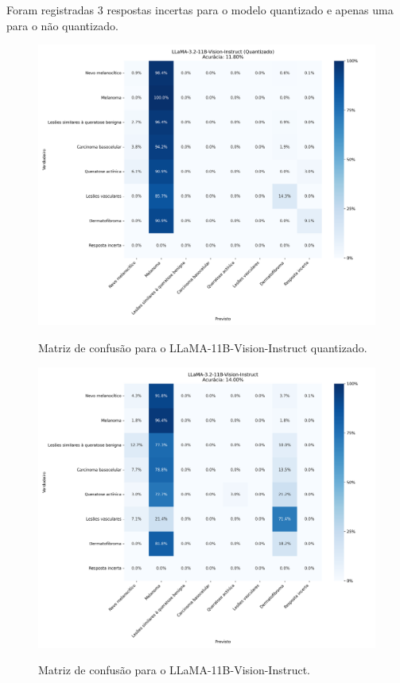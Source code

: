 Foram registradas 3 respostas incertas para o modelo quantizado e apenas uma para o não quantizado.

\begin{figure}[ht]
    \centering
    \caption{\small Matriz de confusão para o \ac{LLaMA}-11B-Vision-Instruct quantizado.}
    \includegraphics[width=1\columnwidth,keepaspectratio]{images/confusion_matrix_llama_3.2_11b_vision_instruct_quantized.png}
    \label{fig:confusion_matrix_llama_quantized}
\end{figure}

\clearpage

\begin{figure}[ht]
    \centering
    \caption{\small Matriz de confusão para o \ac{LLaMA}-11B-Vision-Instruct.}
    \includegraphics[width=1\columnwidth,keepaspectratio]{images/confusion_matrix_llama_3.2_11b_vision_instruct.png}
    \label{fig:confusion_matrix_llama}
\end{figure}

